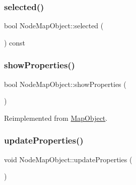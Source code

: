 \mbox{\label{class_node_map_object_a550f0cab2df541115b36c9d483490251}} 
\subsubsection{\texorpdfstring{selected()}{selected()}}
{\footnotesize\ttfamily bool Node\+Map\+Object\+::selected (\begin{DoxyParamCaption}{ }\end{DoxyParamCaption}) const\hspace{0.3cm}{\ttfamily [inline]}}

\mbox{\label{class_node_map_object_a58403912a2303138ee20e727c1c4a1b7}} 
\subsubsection{\texorpdfstring{showProperties()}{showProperties()}}
{\footnotesize\ttfamily bool Node\+Map\+Object\+::show\+Properties (\begin{DoxyParamCaption}{ }\end{DoxyParamCaption})\hspace{0.3cm}{\ttfamily [virtual]}}



Reimplemented from \mbox{\hyperlink{class_map_object_ac58ccb02d5d96d934939b217020c822c}{Map\+Object}}.

\mbox{\label{class_node_map_object_aed89e0f53469ec8af0675463ac11a9e7}} 
\subsubsection{\texorpdfstring{updateProperties()}{updateProperties()}}
{\footnotesize\ttfamily void Node\+Map\+Object\+::update\+Properties (\begin{DoxyParamCaption}{ }\end{DoxyParamCaption})\hspace{0.3cm}{\ttfamily [virtual]}}



